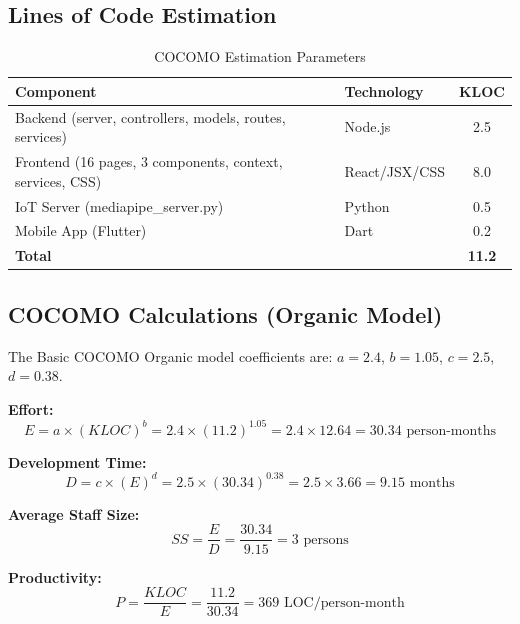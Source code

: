 \documentclass[12pt,a4paper]{report}
\begin{document}
\subsection{Lines of Code Estimation}
\begin{table}[H]
\centering
\caption{COCOMO Estimation Parameters}
\label{tab:cocomo}
\begin{tabular}{|l|l|c|}
\hline
\textbf{Component} & \textbf{Technology} & \textbf{KLOC} \\
\hline
Backend (server, controllers, models, routes, services) & Node.js & 2.5 \\
Frontend (16 pages, 3 components, context, services, CSS) & React/JSX/CSS & 8.0 \\
IoT Server (mediapipe\_server.py) & Python & 0.5 \\
Mobile App (Flutter) & Dart & 0.2 \\
\hline
\textbf{Total} & & \textbf{11.2} \\
\hline
\end{tabular}
\end{table}

\subsection{COCOMO Calculations (Organic Model)}
The Basic COCOMO Organic model coefficients are: $a = 2.4$, $b = 1.05$, $c = 2.5$, $d = 0.38$.

\textbf{Effort:}
\begin{equation}
E = a \times (KLOC)^b = 2.4 \times (11.2)^{1.05} = 2.4 \times 12.64 = \boxed{30.34 \text{ person-months}}
\end{equation}

\textbf{Development Time:}
\begin{equation}
D = c \times (E)^d = 2.5 \times (30.34)^{0.38} = 2.5 \times 3.66 = \boxed{9.15 \text{ months}}
\end{equation}

\textbf{Average Staff Size:}
\begin{equation}
SS = \frac{E}{D} = \frac{30.34}{9.15} = \boxed{3 \text{ persons}}
\end{equation}

\textbf{Productivity:}
\begin{equation}
P = \frac{KLOC}{E} = \frac{11.2}{30.34} = \boxed{369 \text{ LOC/person-month}}
\end{equation}
\end{document}
